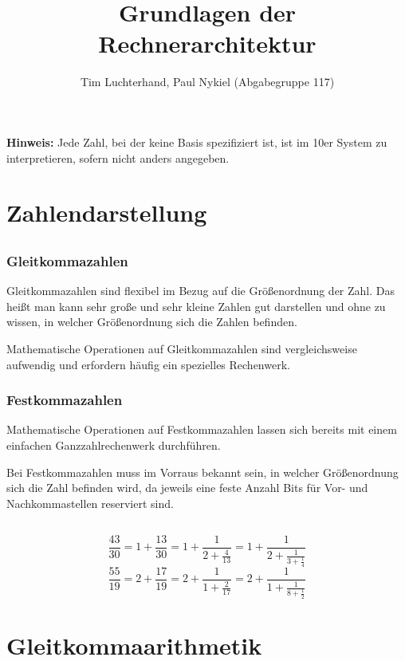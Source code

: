 \documentclass[DIN, pagenumber=false, fontsize=11pt, parskip=half]{scrartcl}
\title{Grundlagen der Rechnerarchitektur}
\author{Tim Luchterhand, Paul Nykiel (Abgabegruppe 117)}
\begin{document}
    \maketitle
    \textbf{Hinweis: } Jede Zahl, bei der keine Basis spezifiziert ist, ist im 10er System zu interpretieren, sofern nicht anders angegeben.
    \section{Zahlendarstellung}
    \subsection{}
    \subsubsection{Gleitkommazahlen}
    Gleitkommazahlen sind flexibel im Bezug auf die Größenordnung der Zahl. Das heißt man kann sehr große und sehr kleine Zahlen gut darstellen und 
    ohne zu wissen, in welcher Größenordnung sich die Zahlen befinden.

    Mathematische Operationen auf Gleitkommazahlen sind vergleichsweise aufwendig und erfordern häufig ein spezielles Rechenwerk.
    \subsubsection{Festkommazahlen}
    Mathematische Operationen auf Festkommazahlen lassen sich bereits mit einem einfachen Ganzzahlrechenwerk durchführen.

    Bei Festkommazahlen muss im Vorraus bekannt sein, in welcher Größenordnung sich die Zahl befinden wird, da jeweils eine feste Anzahl Bits für 
    Vor- und Nachkommastellen reserviert sind.

    \subsection{}
    \begin{equation*}
        \frac{43}{30} = 1 + \frac{13}{30} = 1 + \frac{1}{2+\frac{4}{13}} = 1 +\frac{1}{2+\frac{1}{3+\frac{1}{4}}}
    \end{equation*}
    \begin{equation*}
        \frac{55}{19} = 2 + \frac{17}{19} = 2 + \frac{1}{1 + \frac{2}{17}} = 2 + \frac{1}{1 +  \frac{1}{8 + \frac{1}{2}}}
    \end{equation*}

    \section{Gleitkommaarithmetik}
    \setcounter{subsection}{2}
\end{document}
